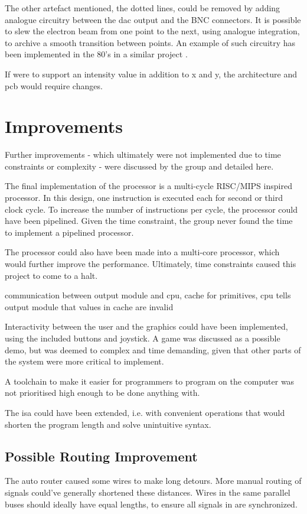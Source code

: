The other artefact mentioned, the dotted lines, could be removed by adding analogue circuitry between the \gls{dac} output and the BNC connectors.
It is possible to slew the electron beam from one point to the next, using analogue integration, to archive a smooth transition between points.
An example of such circuitry has been implemented in the 80's in a similar project \cite{vector-graphic-crt}.

If \vthreek were to support an intensity value in addition to x and y, the architecture and \gls{pcb} would require changes.

\section{Improvements}
Further improvements - which ultimately were not implemented due to time constraints or complexity - were discussed by the group and detailed here.

The final implementation of the processor is a multi-cycle RISC/MIPS inspired processor.
In this design, one instruction is executed each for second or third clock cycle.
To increase the number of instructions per cycle, the processor could have been pipelined.
Given the time constraint, the group never found the time to implement a pipelined processor.

The processor could also have been made into a multi-core processor, which would further improve the performance. Ultimately, time constraints caused this project to come to a halt.

communication between output module and cpu, cache for primitives, cpu tells output module that values in cache are invalid

Interactivity between the user and the graphics could have been implemented, using the included buttons and joystick. A game was discussed as a possible demo, but was deemed to complex and time demanding, given that other parts of the system were more critical to implement.

A toolchain to make it easier for programmers to program on the computer was not prioritised high enough to be done anything with.

The \gls{isa} could have been extended, i.e. with convenient operations that would shorten the program length and solve unintuitive syntax.

\subsection{Possible Routing Improvement}
The auto router caused some wires to make long detours. 
More manual routing of signals could've generally shortened these distances. 
Wires in the same parallel buses should ideally have equal lengths, to ensure all signals in are synchronized. 
